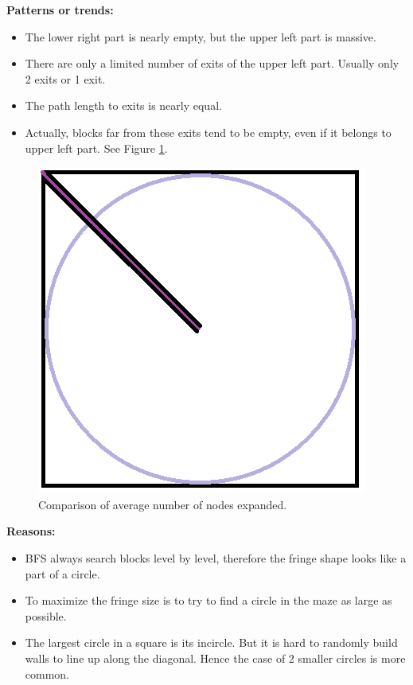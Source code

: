 \documentclass[letter]{article}
\begin{document}
\begin{enumerate}[resume]
\begin{enumerate}
\begin{enumerate}
				\textbf{Patterns or trends:} 
				\begin{itemize}
					\item {The lower right part is nearly empty, but the upper left part is massive.}
					\item {There are only a limited number of exits of the upper left part. Usually only 2 exits or 1 exit.}
					\item {The path length to exits is nearly equal.}
					\item {Actually, blocks far from these exits tend to be empty, even if it belongs to upper left part. See Figure \ref{fig:bf-pattern}.}
				\end{itemize}
				
				\begin{figure}
					\centering
					\includegraphics[width=\textwidth]{../pics/bf/pattern.png}
					\caption{\label{fig:bf-pattern} Comparison of average number of nodes expanded.}
				\end{figure}
				
				\textbf{Reasons:} 
				\begin{itemize}
					\item {BFS always search blocks level by level, therefore the fringe shape looks like a part of a circle.}
					\item {To maximize the fringe size is to try to find a circle in the maze as large as possible.}
					\item {The largest circle in a square is its incircle. But it is hard to randomly build walls to line up along the diagonal. Hence the case of 2 smaller circles is more common.}
				\end{itemize}
				

\end{enumerate}
\end{enumerate}
\end{enumerate}
\end{document}

